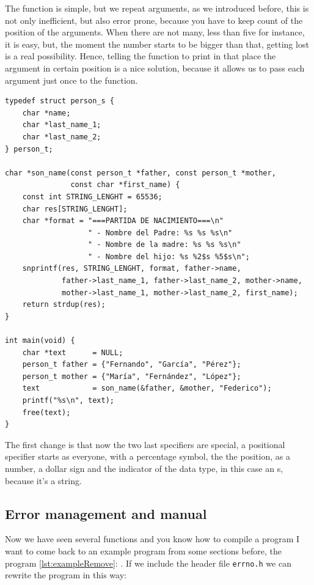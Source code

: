 \documentclass[a4paper]{article}
\begin{document}
The function is simple, but we repeat arguments, as we introduced before,
this is not only inefficient, but also error prone, because you have to keep
count of the position of the arguments. When there are not many, less than five
for instance, it is easy, but, the moment the number starts to be bigger than
that, getting lost is a real possibility. Hence, telling the function
to print in that place the argument in certain position is a nice solution,
because it allows us to pass each argument just once to the function.

\noindent
\begin{minipage}[H]{\linewidth}
\mbox{}
\begin{lstlisting}[style=C,
caption={Example of positional specifier},
label={lst:repeatedMessagesPos}]
typedef struct person_s {
    char *name;
    char *last_name_1;
    char *last_name_2;
} person_t;

char *son_name(const person_t *father, const person_t *mother,
               const char *first_name) {
    const int STRING_LENGHT = 65536;
    char res[STRING_LENGHT];
    char *format = "===PARTIDA DE NACIMIENTO===\n"
                   " - Nombre del Padre: %s %s %s\n"
                   " - Nombre de la madre: %s %s %s\n"
                   " - Nombre del hijo: %s %2$s %5$s\n";
    snprintf(res, STRING_LENGHT, format, father->name,
             father->last_name_1, father->last_name_2, mother->name,
             mother->last_name_1, mother->last_name_2, first_name);
    return strdup(res);
}

int main(void) {
    char *text      = NULL;
    person_t father = {"Fernando", "García", "Pérez"};
    person_t mother = {"María", "Fernández", "López"};
    text            = son_name(&father, &mother, "Federico");
    printf("%s\n", text);
    free(text);
}
\end{lstlisting}
\end{minipage}

The first change is that now the two last specifiers are special, a positional
specifier starts as everyone, with a percentage symbol, the the position, as
a number, a dollar sign and the indicator of the data type, in this case an
s, because it's a string.

\subsection{Error management and manual}
Now we have seen several functions and you know how to compile a program I want
to come back to an example program from some sections before, the program
\ref{lst:exampleRemove}: . If we include the header
file \verb!errno.h! we can rewrite the program in this way:
\end{document}
